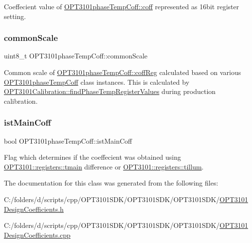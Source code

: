 Coeffecient value of \mbox{\hyperlink{class_o_p_t3101phase_temp_coff_a620b60e04178524cfa6a7bf558f1976c}{O\+P\+T3101phase\+Temp\+Coff\+::coff}} represented as 16bit register setting. 

\mbox{\label{class_o_p_t3101phase_temp_coff_a2cddefa4a6f418f7c90ba236143a2d1d}} 
\subsubsection{\texorpdfstring{common\+Scale}{commonScale}}
{\footnotesize\ttfamily uint8\+\_\+t O\+P\+T3101phase\+Temp\+Coff\+::common\+Scale}



Common scale of \mbox{\hyperlink{class_o_p_t3101phase_temp_coff_ad838e80740244ac22e7e63f6f6f18ab6}{O\+P\+T3101phase\+Temp\+Coff\+::coff\+Reg}} calculated based on various \mbox{\hyperlink{class_o_p_t3101phase_temp_coff}{O\+P\+T3101phase\+Temp\+Coff}} class instances. This is calculated by \mbox{\hyperlink{class_o_p_t3101_calibration_aec7a07b81ddeb24225d9d4b15200302c}{O\+P\+T3101\+Calibration\+::find\+Phase\+Temp\+Register\+Values}} during production calibration. 

\mbox{\label{class_o_p_t3101phase_temp_coff_a1a23b6ee727c71eb59b07bda0c81476b}} 
\subsubsection{\texorpdfstring{ist\+Main\+Coff}{istMainCoff}}
{\footnotesize\ttfamily bool O\+P\+T3101phase\+Temp\+Coff\+::ist\+Main\+Coff}



Flag which determines if the coeffecient was obtained using \mbox{\hyperlink{class_o_p_t3101_1_1registers_a3dfd8d81d4cb04d274007deb7c6122fc}{O\+P\+T3101\+::registers\+::tmain}} difference or \mbox{\hyperlink{class_o_p_t3101_1_1registers_a8a097a41ecdf2b98226c4a3a92121c12}{O\+P\+T3101\+::registers\+::tillum}}. 



The documentation for this class was generated from the following files\+:\begin{DoxyCompactItemize}
\item 
C\+:/folders/d/scripts/cpp/\+O\+P\+T3101\+S\+D\+K/\+O\+P\+T3101\+S\+D\+K/\+O\+P\+T3101\+S\+D\+K/\mbox{\hyperlink{_o_p_t3101_design_coefficients_8h}{O\+P\+T3101\+Design\+Coefficients.\+h}}\item 
C\+:/folders/d/scripts/cpp/\+O\+P\+T3101\+S\+D\+K/\+O\+P\+T3101\+S\+D\+K/\+O\+P\+T3101\+S\+D\+K/\mbox{\hyperlink{_o_p_t3101_design_coefficients_8cpp}{O\+P\+T3101\+Design\+Coefficients.\+cpp}}\end{DoxyCompactItemize}
